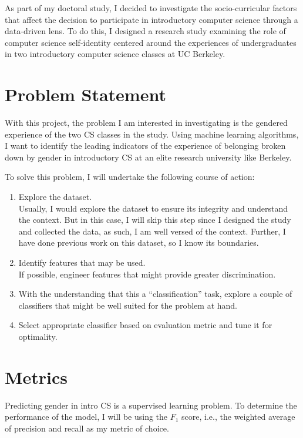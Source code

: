As part of my doctoral study, I decided to investigate the socio-curricular factors that affect the decision to participate in introductory computer science through a data-driven lens. To do this, I designed a research study examining the role of computer science self-identity centered around the experiences of undergraduates in two introductory computer science classes at UC Berkeley. 


\section*{Problem Statement}

With this project, the problem I am interested in investigating is the gendered experience of the two CS classes in the study. Using machine learning algorithms, I want to identify the leading indicators of the experience of belonging broken down by gender in introductory CS at an elite research university like Berkeley.

To solve this problem, I will undertake the following course of action:
\begin{enumerate}%
\item Explore the dataset.\\
Usually, I would explore the dataset to ensure its integrity and understand the context. But in this case, I will skip this step since I designed the study and collected the data, as such, I am well versed of the context. Further, I have done previous work on this dataset, so I know its boundaries.
\item Identify features that may be used.\\ 
If possible, engineer features that might provide greater discrimination.
\item With the understanding that this a ``classification'' task, explore a couple of classifiers that might be well suited for the problem at hand.
\item Select appropriate classifier based on evaluation metric and tune it for optimality.
\end{enumerate}

\section*{Metrics}


Predicting gender in intro CS is a supervised learning problem. To determine the performance of the model, I will be using the $F_1$ score, i.e., the weighted average of precision and recall as my metric of choice. 

